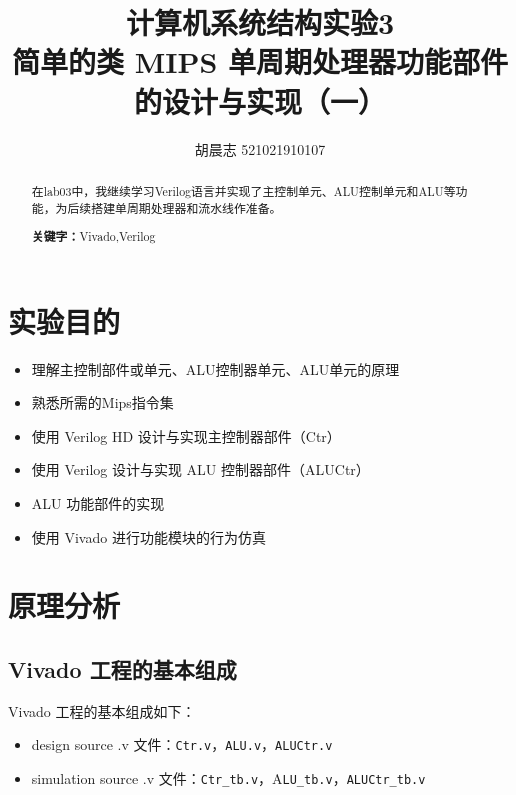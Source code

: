 \documentclass{progartcn}
\title{\bfseries\sffamily
  计算机系统结构实验3 \\ 简单的类 MIPS 单周期处理器功能部件的设计与实现（一）
}
\author{胡晨志 521021910107}
\date{}
\begin{document}
\sloppy %


\maketitle
\thispagestyle{empty}

\begin{abstract}
\noindent 在lab03中，我继续学习Verilog语言并实现了主控制单元、ALU控制单元和ALU等功能，为后续搭建单周期处理器和流水线作准备。

\vspace{2ex}
\noindent \textbf{关键字：}Vivado,\hspace{.5em}Verilog
\end{abstract}

\tableofcontents

\setcounter{page}{0}
\newpage

\section{实验目的}

\begin{itemize}
  \item 理解主控制部件或单元、ALU控制器单元、ALU单元的原理
  \item 熟悉所需的Mips指令集
  \item 使用 Verilog HD 设计与实现主控制器部件（Ctr）
  \item 使用 Verilog 设计与实现 ALU 控制器部件（ALUCtr）
  \item ALU 功能部件的实现
  \item 使用 Vivado 进行功能模块的行为仿真
\end{itemize}

\section{原理分析}

\subsection{Vivado 工程的基本组成}

Vivado 工程的基本组成如下：

\begin{itemize}
  \item design source .v 文件：\verb|Ctr.v|，\verb|ALU.v|，\verb|ALUCtr.v|
  \item simulation source .v 文件：\verb|Ctr_tb.v|，A\verb|LU_tb.v|，\verb|ALUCtr_tb.v|
\end{itemize}
\end{document}
